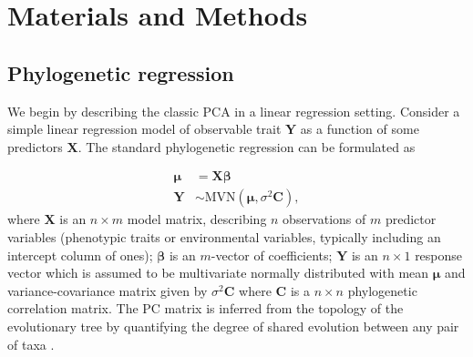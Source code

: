 \documentclass[12pt]{article}
\begin{document}
\section*{Materials and Methods}

\newcommand{\bX}{{\mathbf X}}
\newcommand{\bbeta}{{\boldsymbol \beta}}
\newcommand{\bmu}{{\boldsymbol \mu}}
\newcommand{\bY}{{\mathbf Y}}
\newcommand{\bC}{{\mathbf C}}
\newcommand{\bZ}{{\mathbf Z}}
\newcommand{\bb}{{\mathbf b}}
\newcommand{\besp}{{\boldsymbol \epsilon}}
\newcommand{\bSigma}{{\boldsymbol \Sigma}}

\subsection*{Phylogenetic regression}

We begin by describing the classic PCA in a linear regression setting.
Consider a simple linear regression model of observable trait $\bY$ as a function of some predictors $\bX$. 
The standard phylogenetic regression can be formulated as


\begin{align}
\bmu & = \bX \bbeta  \label{eq:gls1} \\ 
\bY & \sim \textrm{MVN}(\bmu,\sigma^{2} \bC), \label{eq:gls2}
\end{align}
where $\bX$ is an $n \times m$ model matrix, describing $n$ observations of $m$ predictor variables (phenotypic traits or environmental variables, typically including an intercept column of ones); $\bbeta$ is an $m$-vector of coefficients; $\bY$ is an $n \times 1$ response vector which is assumed to be multivariate normally distributed with mean $\bmu$ and variance-covariance matrix given by $\sigma^{2} \bC$ where $\bC$ is a $n \times n$ phylogenetic correlation matrix.
The PC matrix is inferred from the topology of the evolutionary tree by quantifying the degree of shared evolution between any pair of taxa \citep{garamszegi2014modern}.

\end{document}
